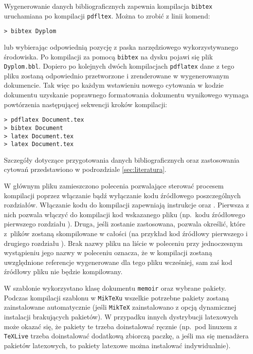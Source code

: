 Wygenerowanie danych bibliograficznych zapewnia kompilacja \texttt{bibtex} uruchamiana po kompilacji \texttt{pdfltex}. Można to zrobić z linii komend:
\begin{lstlisting}[basicstyle=\ttfamily]
> bibtex Dyplom
\end{lstlisting}
lub wybierając odpowiednią pozycję z paska narzędziowego wykorzystywanego środowiska. Po kompilacji za pomocą \texttt{bibtex} na dysku pojawi się plik \texttt{Dyplom.bbl}. Dopiero po kolejnych dwóch kompilacjach \texttt{pdflatex} dane z tego pliku zostaną odpowiednio przetworzone i zrenderowane w wygenerowanym dokumencie. Tak więc po każdym wstawieniu nowego cytowania w kodzie dokumentu uzyskanie poprawnego formatowania dokumentu wynikowego wymaga powtórzenia następującej sekwencji kroków kompilacji:
\begin{lstlisting}[basicstyle=\ttfamily]
> pdflatex Document.tex
> bibtex Document
> latex Document.tex
> latex Document.tex
\end{lstlisting}
Szczegóły dotyczące przygotowania danych bibliograficznych oraz zastosowania cytowań przedstawiono w podrozdziale \ref{sec:literatura}.

W głównym pliku zamieszczono polecenia pozwalające sterować procesem kompilacji poprzez włączanie bądź wyłączanie kodu źródłowego poszczególnych rozdziałów. Włączanie kodu do kompilacji zapewniają instrukcje \verb++ oraz \verb++. Pierwsza z nich pozwala włączyć do kompilacji kod wskazanego pliku (np.\ kodu źródłowego pierwszego rozdziału \verb++). Druga, jeśli zostanie zastosowana, pozwala określić, które z~plików zostaną skompilowane w całości (na przykład kod źródłowy pierwszego i drugiego rozdziału \verb++). Brak nazwy pliku na liście w poleceniu \verb++ przy jednoczesnym wystąpieniu jego nazwy w poleceniu \verb++ oznacza, że w kompilacji zostaną uwzględnione referencje wygenerowane dla tego pliku wcześniej, sam zaś kod źródłowy pliku nie będzie kompilowany. 

W szablonie wykorzystano klasę dokumentu \texttt{memoir} oraz wybrane pakiety. Podczas kompilacji szablonu w \texttt{MikTeXu} wszelkie potrzebne pakiety zostaną zainstalowane automatycznie (jeśli \texttt{MikTeX} zainstalowano z opcją dynamicznej instalacji brakujących pakietów). W przypadku innych dystrybucji latexowych może okazać się, że pakiety te trzeba doinstalować ręcznie (np.\ pod linuxem z \texttt{TeXLive} trzeba doinstalować dodatkową zbiorczą paczkę, a jeśli ma się menadżera pakietów latexowych, to pakiety latexowe można instalować indywidualnie).

